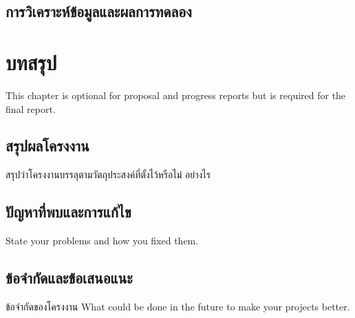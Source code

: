 \documentclass[12pt,oneside,openright,a4paper]{cpe-thai-project}
\begin{document}
\section{การวิเคราะห์ข้อมูลและผลการทดลอง}

\chapter{บทสรุป}

This chapter is optional for proposal and progress reports but 
is required for the final report.

\section{สรุปผลโครงงาน}
สรุปว่าโครงงานบรรลุตามวัตถุประสงค์ที่ตั้งไว้หรือไม่ อย่างไร 

\section{ปัญหาที่พบและการแก้ไข}
State your problems and how you fixed them.

\section{ข้อจำกัดและข้อเสนอแนะ}
ข้อจำกัดของโครงงาน What could be done in the future to make your projects better.



\makeatletter
\g@addto@macro{\UrlBreaks}{\UrlOrds}
\makeatother




 \\
\end{document}
